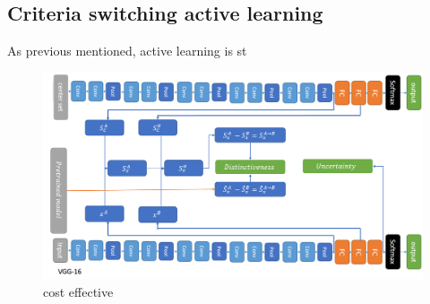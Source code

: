 \subsection{Criteria switching active learning}
As previous mentioned, active learning is st 
\begin{figure}[ht]
\begin{center}
\includegraphics[width=1\columnwidth]{Image/vgg.PNG}
\caption[vgg]{ cost effective }
\label{fig:BoxesAndArrowsAreNice}
\end{center}
\end{figure}
\cite{costeffective}
\cite{costeffective2}